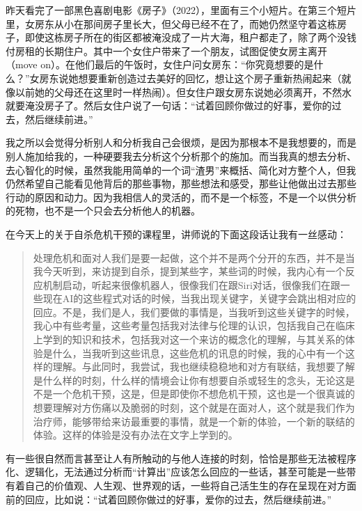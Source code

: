 昨天看完了一部黑色喜剧电影《房子》（2022），里面有三个小短片。在第三个短片里，女房东从小在那间房子里长大，但父母已经不在了，而她仍然坚守着这栋房子，即使这栋房子所在的街区都被淹没成了一片大海，租户都走了，除了两个没钱付房租的长期住户。其中一个女住户带来了一个朋友，试图促使女房主离开（move on）。在他们最后的午饭时，女住户问女房东：“你究竟想要的是什么？”女房东说她想要重新创造过去美好的回忆，想让这个房子重新热闹起来（就像以前她的父母还在这里时一样热闹）。但女住户跟女房东说她必须离开，不然水就要淹没房子了。然后女住户说了一句话：“试着回顾你做过的好事，爱你的过去，然后继续前进。”

\tristarsepline

我之所以会觉得分析别人和分析我自己会很烦，是因为那根本不是我想要的，而是别人施加给我的，一种硬要我去分析这个分析那个的施加。而当我真的想去分析、去心智化的时候，虽然我能用简单的一个词“渣男”来概括、简化对方整个人，但我仍然希望自己能看见他背后的那些事物，那些想法和感受，那些让他做出过去那些行动的原因和动力。因为我相信人的灵活的，而不是一个标签，不是一个以供分析的死物，也不是一个只会去分析他人的机器。

在今天上的关于自杀危机干预的课程里，讲师说的下面这段话让我有一丝感动：

\blockquote{处理危机和面对人我们是要一起做，这个并不是两个分开的东西，并不是当我今天听到，来访提到自杀，提到某些字，某些词的时候，我内心有一个反应机制启动，听起来很像机器人，很像我们在跟Siri对话，很像我们在跟一些现在AI的这些程式对话的时候，当我出现关键字，关键字会跳出相对应的回应。不是，我们是人，我们要做的事情是，当我听到这些关键字的时候，我心中有些考量，这些考量包括我对法律与伦理的认识，包括我自己在临床上学到的知识和技术，包括我对这一个来访的概念化的理解，与其关系的体验是什么，当我听到这些讯息，这些危机的讯息的时候，我的心中有一个这样的理解。与此同时，我尝试，我也继续稳稳地和对方有联结，我想要了解是什么样的时刻，什么样的情境会让你有想要自杀或轻生的念头，无论这是不是一个危机干预，这是，但是即使你不想危机干预，这也是一个很真诚的想要理解对方伤痛以及脆弱的时刻，这个就是在面对人，这个就是我们作为治疗师，能够带给来访最重要的事情，就是一个新的体验，一个新的联结的体验。这样的体验是没有办法在文字上学到的。}

有一些很自然而言甚至让人有所触动的与他人连接的时刻，恰恰是那些无法被程序化、逻辑化，无法通过分析而“计算出”应该怎么回应的一些话，甚至可能是一些带有着自己的价值观、人生观、世界观的话，一些将自己活生生的存在呈现在对方面前的回应，比如说：“试着回顾你做过的好事，爱你的过去，然后继续前进。”

